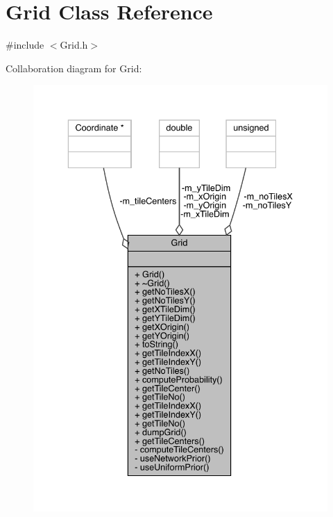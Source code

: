 \hypertarget{class_grid}{}\section{Grid Class Reference}
\label{class_grid}


{\ttfamily \#include $<$Grid.\+h$>$}



Collaboration diagram for Grid\+:\nopagebreak
\begin{figure}[H]
\begin{center}
\leavevmode
\includegraphics[width=336pt]{class_grid__coll__graph}
\end{center}
\end{figure}
